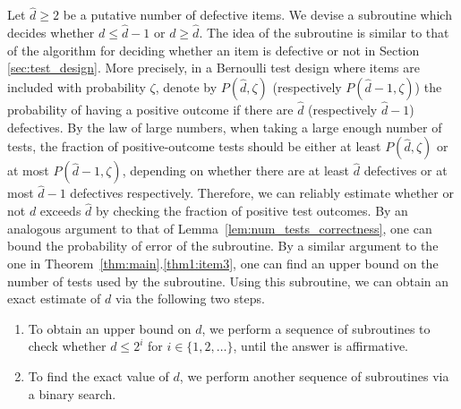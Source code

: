 \documentclass[onecolumn,letterpaper]{IEEEtran}
\newcommand{\ts}{{\ell}}
\newcommand{\cp}{{q}}
\newcommand{\pgap}{{\Delta(\cp)}}
\newcommand{\up}{{U}}
\newcommand{\lw}{{L}}
\newcommand{\cpns}{\cp_0}
\newcommand{\pgapns}{{\Delta(\cpns)}}
\newcommand{\ud}{{\hat{d}}}
\newcommand{\lomp}{{P}}
\newcommand{\lomcp}{{\zeta}}
\newcommand{\lompp}{{\lomp(\ud,\lomcp)}}
\newcommand{\lomppo}{{\lomp(\ud-1,\lomcp)}}
\begin{document}
 Let $\ud \geq 2$ be a putative number of defective items. We devise a subroutine which decides whether $d\leq \ud-1$ or $d\geq \ud$. The idea of the subroutine is similar to that of the algorithm for deciding whether an item is defective or not in Section \ref{sec:test_design}. More precisely, in a Bernoulli test design where items are included with probability $\lomcp$, denote by $\lompp$ (respectively $\lomppo$) 
the probability of having a positive outcome if there are $\ud$ (respectively $\ud-1$) defectives. By the law of large numbers, when taking a large
enough number of tests, the fraction of positive-outcome tests should be either at least $\lompp$ or at most $\lomppo$, depending on whether
there are at least $\ud$ defectives or at most $\ud-1$ defectives respectively. Therefore, we can reliably estimate whether or not $d$ exceeds $\ud$ by checking the fraction of positive test outcomes. By an analogous argument to that of Lemma~\ref{lem:num_tests_correctness}, one can bound the probability of error of the subroutine. 
By a similar argument to the one in Theorem~\ref{thm:main}.\ref{thm1:item3}, one can find an upper bound on the number of tests used by the subroutine. Using this subroutine, we can obtain an exact estimate of $d$ via the following two steps.
\begin{enumerate}[label=(\roman*)]
    \item To obtain an upper bound on $d$, we perform a sequence of subroutines to check whether $d\leq 2^i$ for $i\in \{1,2, \dots\}$, until the answer is affirmative. 
    \item To find the exact value of $d$, we perform another sequence of subroutines via a binary search. 
\end{enumerate}




\end{document}
